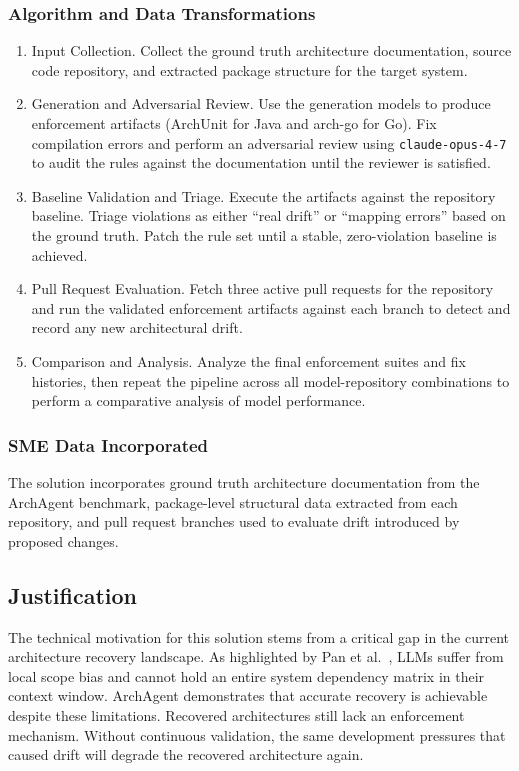 \documentclass[sigconf,screen]{acmart}
\begin{document}
\subsubsection{Algorithm and Data Transformations}
\begin{enumerate}
    \item Input Collection. Collect the ground truth architecture documentation, source code repository, and extracted package structure for the target system.
    \item Generation and Adversarial Review. Use the generation models to produce enforcement artifacts (ArchUnit for Java and arch-go for Go). Fix compilation errors and perform an adversarial review using \texttt{claude-opus-4-7} to audit the rules against the documentation until the reviewer is satisfied.
    \item Baseline Validation and Triage. Execute the artifacts against the repository baseline. Triage violations as either ``real drift'' or ``mapping errors'' based on the ground truth. Patch the rule set until a stable, zero-violation baseline is achieved.
    \item Pull Request Evaluation. Fetch three active pull requests for the repository and run the validated enforcement artifacts against each branch to detect and record any new architectural drift.
    \item Comparison and Analysis. Analyze the final enforcement suites and fix histories, then repeat the pipeline across all model-repository combinations to perform a comparative analysis of model performance.
\end{enumerate}

\subsubsection{SME Data Incorporated}
The solution incorporates ground truth architecture documentation from the ArchAgent benchmark, package-level structural data extracted from each repository, and pull request branches used to evaluate drift introduced by proposed changes.

\subsection{Justification}
The technical motivation for this solution stems from a critical gap in the current architecture recovery landscape. As highlighted by Pan et al.~\cite{pan2026}, LLMs suffer from local scope bias and cannot hold an entire system dependency matrix in their context window. ArchAgent demonstrates that accurate recovery is achievable despite these limitations. Recovered architectures still lack an enforcement mechanism. Without continuous validation, the same development pressures that caused drift will degrade the recovered architecture again.
\end{document}
